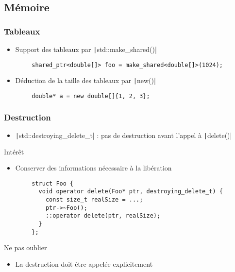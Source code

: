 \documentclass[C++.tex]{subfiles}
\begin{document}
\subsection*{Mémoire}
\begin{frame}[fragile]
	\frametitle{Tableaux}
	\begin{itemize}
		\item Support des tableaux par \texttt|std::make_shared()|
	\end{itemize}

	\begin{verbatim}
		shared_ptr<double[]> foo = make_shared<double[]>(1024);
	\end{verbatim}

	\begin{itemize}
		\item Déduction de la taille des tableaux par \texttt|new()|
	\end{itemize}

	\begin{verbatim}
		double* a = new double[]{1, 2, 3};
	\end{verbatim}
\end{frame}

\begin{frame}[fragile]
	\frametitle{Destruction}
	\begin{itemize}
		\item \texttt|std::destroying_delete_t| : pas de destruction avant l'appel à \texttt|delete()|
	\end{itemize}

	\begin{block}{Intérêt}
		\begin{itemize}
			\item Conserver des informations nécessaire à la libération
		\end{itemize}
	\end{block}

	\begin{verbatim}
		struct Foo {
		  void operator delete(Foo* ptr, destroying_delete_t) {
		    const size_t realSize = ...;
		    ptr->~Foo();
		    ::operator delete(ptr, realSize);
		  }
		};
	\end{verbatim}

	\begin{alertblock}{Ne pas oublier}
		\begin{itemize}
			\item La destruction doit être appelée explicitement
		\end{itemize}
	\end{alertblock}
\end{frame}
\end{document}

